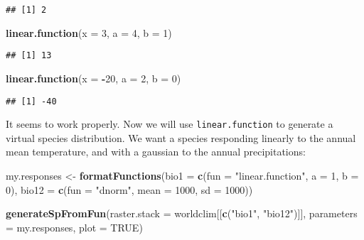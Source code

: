 \documentclass[]{article}
\newenvironment{Shaded}{\begin{snugshade}}{\end{snugshade}}
\newcommand{\KeywordTok}[1]{\textcolor[rgb]{0.13,0.29,0.53}{\textbf{#1}}}
\newcommand{\DataTypeTok}[1]{\textcolor[rgb]{0.13,0.29,0.53}{#1}}
\newcommand{\DecValTok}[1]{\textcolor[rgb]{0.00,0.00,0.81}{#1}}
\newcommand{\StringTok}[1]{\textcolor[rgb]{0.31,0.60,0.02}{#1}}
\newcommand{\OtherTok}[1]{\textcolor[rgb]{0.56,0.35,0.01}{#1}}
\newcommand{\OperatorTok}[1]{\textcolor[rgb]{0.81,0.36,0.00}{\textbf{#1}}}
\newcommand{\NormalTok}[1]{#1}
\begin{document}
\begin{verbatim}
## [1] 2
\end{verbatim}

\begin{Shaded}
\begin{Highlighting}[]
\KeywordTok{linear.function}\NormalTok{(}\DataTypeTok{x =} \DecValTok{3}\NormalTok{, }\DataTypeTok{a =} \DecValTok{4}\NormalTok{, }\DataTypeTok{b =} \DecValTok{1}\NormalTok{)}
\end{Highlighting}
\end{Shaded}

\begin{verbatim}
## [1] 13
\end{verbatim}

\begin{Shaded}
\begin{Highlighting}[]
\KeywordTok{linear.function}\NormalTok{(}\DataTypeTok{x =} \OperatorTok{-}\DecValTok{20}\NormalTok{, }\DataTypeTok{a =} \DecValTok{2}\NormalTok{, }\DataTypeTok{b =} \DecValTok{0}\NormalTok{)}
\end{Highlighting}
\end{Shaded}

\begin{verbatim}
## [1] -40
\end{verbatim}

It seems to work properly. Now we will use \texttt{linear.function} to
generate a virtual species distribution. We want a species responding
linearly to the annual mean temperature, and with a gaussian to the
annual precipitations:

\begin{Shaded}
\begin{Highlighting}[]
\NormalTok{my.responses <-}\StringTok{ }\KeywordTok{formatFunctions}\NormalTok{(}\DataTypeTok{bio1 =} \KeywordTok{c}\NormalTok{(}\DataTypeTok{fun =} \StringTok{"linear.function"}\NormalTok{, }\DataTypeTok{a =} \DecValTok{1}\NormalTok{, }\DataTypeTok{b =} \DecValTok{0}\NormalTok{),}
                                \DataTypeTok{bio12 =} \KeywordTok{c}\NormalTok{(}\DataTypeTok{fun =} \StringTok{"dnorm"}\NormalTok{, }\DataTypeTok{mean =} \DecValTok{1000}\NormalTok{, }\DataTypeTok{sd =} \DecValTok{1000}\NormalTok{))}

\KeywordTok{generateSpFromFun}\NormalTok{(}\DataTypeTok{raster.stack =}\NormalTok{ worldclim[[}\KeywordTok{c}\NormalTok{(}\StringTok{"bio1"}\NormalTok{, }\StringTok{"bio12"}\NormalTok{)]],}
                  \DataTypeTok{parameters =}\NormalTok{ my.responses, }\DataTypeTok{plot =} \OtherTok{TRUE}\NormalTok{)}
\end{Highlighting}
\end{Shaded}
\end{document}
